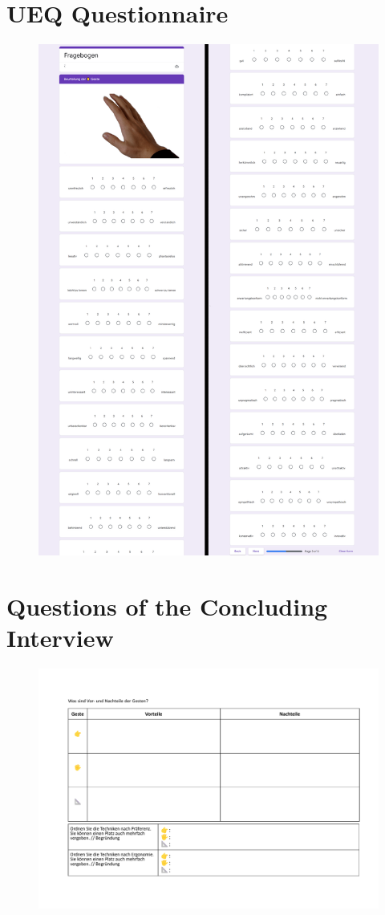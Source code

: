 \section{UEQ Questionnaire}
\begin{figure}[hbt!]
\centering
\includegraphics[width=\textwidth]{figures/Appendix/ueq.png}
\end{figure}

\section{Questions of the Concluding Interview}
\begin{figure}[hbt!]
\centering
\includegraphics[width=\textwidth]{figures/Appendix/interview.pdf}
\end{figure}
